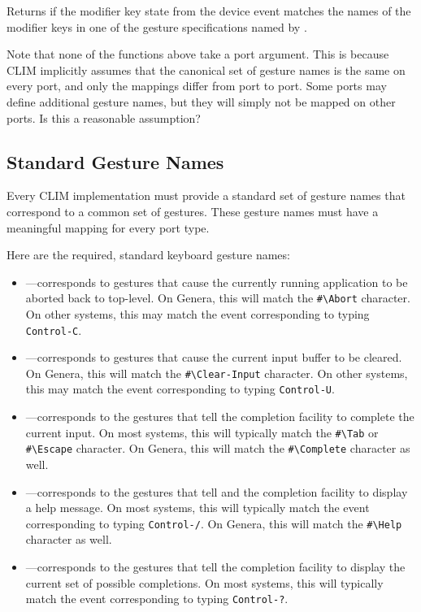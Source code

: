 Returns  if the modifier key state from the device event 
matches the names of the modifier keys in one of the gesture specifications
named by .

 {Note that none of the functions above take a port argument.  This
is because CLIM implicitly assumes that the canonical set of gesture names is
the same on every port, and only the mappings differ from port to port.  Some
ports may define additional gesture names, but they will simply not be mapped on
other ports.  Is this a reasonable assumption?}


\subsection {Standard Gesture Names}

Every CLIM implementation must provide a standard set of gesture names that
correspond to a common set of gestures.  These gesture names must have a
meaningful mapping for every port type.

Here are the required, standard keyboard gesture names:

\begin{itemize}
\item {}---corresponds to gestures that cause the currently running
application to be aborted back to top-level.  On Genera, this will match the
\verb+#\Abort+ character.  On other systems, this may match the event
corresponding to typing {\tt Control-C}.

\item {}---corresponds to gestures that cause the current input
buffer to be cleared.  On Genera, this will match the \verb+#\Clear-Input+
character.  On other systems, this may match the event corresponding to typing
{\tt Control-U}.

\item {}---corresponds to the gestures that tell the completion
facility to complete the current input.  On most systems, this will typically
match the \verb+#\Tab+ or \verb+#\Escape+ character.  On Genera, this will match
the \verb+#\Complete+ character as well.

\item {}---corresponds to the gestures that tell  and the
completion facility to display a help message.  On most systems, this will
typically match the event corresponding to typing {\tt Control-/}.  On Genera,
this will match the \verb+#\Help+ character as well.

\item {}---corresponds to the gestures that tell the completion
facility to display the current set of possible completions.  On most systems,
this will typically match the event corresponding to typing {\tt Control-?}.
\end{itemize}


